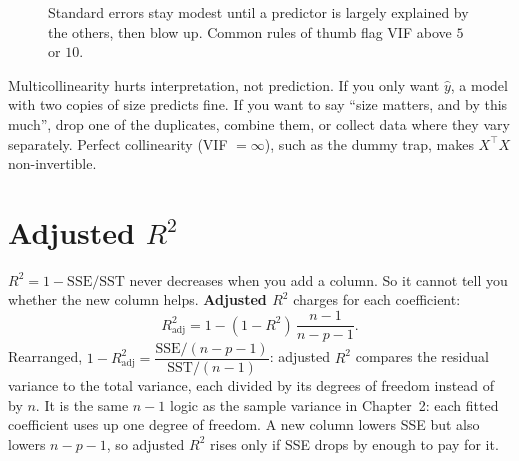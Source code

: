 \begin{figure}[H]
\centering
{}
\caption{Standard errors stay modest until a predictor is largely explained by the
others, then blow up. Common rules of thumb flag VIF above $5$ or $10$.}
\label{fig:mlr-vif}
\end{figure}

\begin{intuitionbox}
Multicollinearity hurts interpretation, not prediction. If you only want $\hat y$, a
model with two copies of size predicts fine. If you want to say ``size matters, and
by this much'', drop one of the duplicates, combine them, or collect data where they
vary separately. Perfect collinearity (VIF $=\infty$), such as the dummy trap, makes
$X^\top X$ non-invertible.
\end{intuitionbox}

\section{Adjusted \texorpdfstring{$R^2$}{R squared}}
\label{sec:mlr-adjr2}

$R^2 = 1 - \text{SSE}/\text{SST}$ never decreases when you add a column. So it cannot
tell you whether the new column helps. \textbf{Adjusted $R^2$} charges for each
coefficient:
\[
  R^2_{\text{adj}} = 1 - (1 - R^2)\,\frac{n-1}{n-p-1}.
\]
Rearranged, $1 - R^2_{\text{adj}} = \dfrac{\text{SSE}/(n-p-1)}{\text{SST}/(n-1)}$: adjusted
$R^2$ compares the residual variance to the total variance, each divided by its degrees
of freedom instead of by $n$. It is the same $n-1$ logic as the sample variance in
Chapter~2: each fitted coefficient uses up one degree of freedom. A new column lowers SSE
but also lowers $n-p-1$, so adjusted $R^2$ rises only if SSE drops by enough to pay for it.

